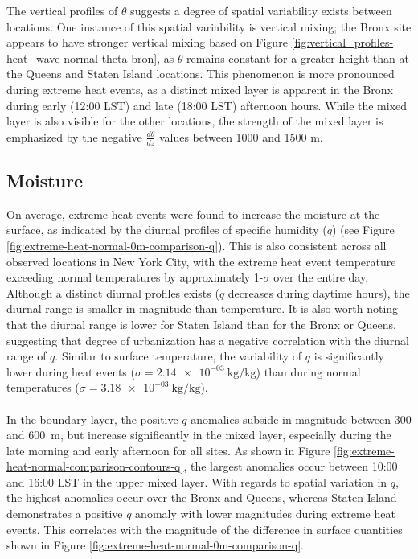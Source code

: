 \documentclass[11pt,a4paper]{article}
\begin{document}
The vertical profiles of $\theta$ suggests a degree of spatial variability exists between locations. One instance of this spatial variability is vertical mixing; the Bronx site appears to have stronger vertical mixing based on Figure \ref{fig:vertical_profiles-heat_wave-normal-theta-bron}, as $\theta$ remains constant for a greater height than at the Queens and Staten Island locations. This phenomenon is more pronounced during extreme heat events, as a distinct mixed layer is apparent in the Bronx during early (12:00 LST) and late (18:00 LST) afternoon hours. While the mixed layer is also visible for the other locations, the strength of the mixed layer is emphasized by the negative $\frac{d\theta}{dz}$ values between 1000 and 1500 m.

\subsection{Moisture}
On average, extreme heat events were found to increase the moisture at the surface, as indicated by the diurnal profiles of specific humidity ($q$) (see Figure \ref{fig:extreme-heat-normal-0m-comparison-q}). This is also consistent across all observed locations in New York City, with the extreme heat event temperature exceeding normal temperatures by approximately 1-$\sigma$ over the entire day. Although a distinct diurnal profiles exists ($q$ decreases during daytime hours), the diurnal range is smaller in magnitude than temperature. It is also worth noting that the diurnal range is lower for Staten Island than for the Bronx or Queens, suggesting that degree of urbanization has a negative correlation with the diurnal range of $q$. Similar to surface temperature, the variability of $q$ is significantly lower during heat events ($ \sigma = \SI{2.14e-03}{\kilo\gram\per\kilo\gram} $) than during normal temperatures ($ \sigma = \SI{3.18e-03}{\kilo\gram\per\kilo\gram} $).
\\ \\
In the boundary layer, the positive $q$ anomalies subside in magnitude between 300 and \SI{600}{\meter}, but increase significantly in the mixed layer, especially during the late morning and early afternoon for all sites. As shown in Figure \ref{fig:extreme-heat-normal-comparison-contours-q}, the largest anomalies occur between 10:00 and 16:00 LST in the upper mixed layer. With regards to spatial variation in $q$, the highest anomalies occur over the Bronx and Queens, whereas Staten Island demonstrates a positive $q$ anomaly with lower magnitudes during extreme heat events. This correlates with the magnitude of the difference in surface quantities shown in Figure \ref{fig:extreme-heat-normal-0m-comparison-q}. 
\end{document}
